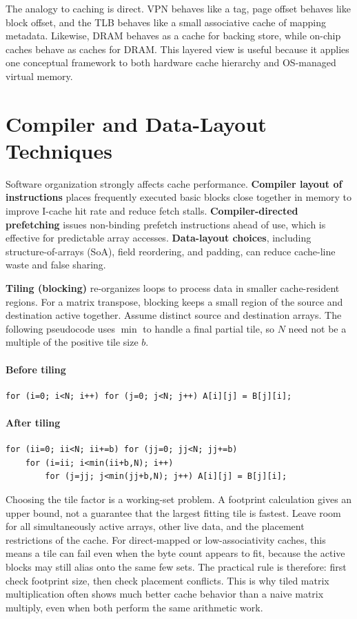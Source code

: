 The analogy to caching is direct.
VPN behaves like a tag, page offset behaves like block offset, and the TLB behaves like a small associative cache of mapping metadata.
Likewise, DRAM behaves as a cache for backing store, while on-chip caches behave as caches for DRAM\@.
This layered view is useful because it applies one conceptual framework to both hardware cache hierarchy and OS-managed virtual memory.


\section{Compiler and Data-Layout Techniques}\label{sec:auto-032}
Software organization strongly affects cache performance.
\textbf{Compiler layout of instructions} places frequently executed basic blocks close together in memory to improve I-cache hit rate and reduce fetch stalls.
\textbf{Compiler-directed prefetching} issues non-binding prefetch instructions ahead of use, which is effective for predictable array accesses.
\textbf{Data-layout choices}, including structure-of-arrays (SoA), field reordering, and padding, can reduce cache-line waste and false sharing.

\textbf{Tiling (blocking)} re-organizes loops to process data in smaller cache-resident regions.
For a matrix transpose, blocking keeps a small region of the source and destination active together.
Assume distinct source and destination arrays.
The following pseudocode uses $\min$ to handle a final partial tile, so $N$ need not be a multiple of the positive tile size $b$.
\paragraph{Before tiling}
\begin{verbatim}
for (i=0; i<N; i++) for (j=0; j<N; j++) A[i][j] = B[j][i];
\end{verbatim}
\paragraph{After tiling}
\begin{verbatim}
for (ii=0; ii<N; ii+=b) for (jj=0; jj<N; jj+=b)
    for (i=ii; i<min(ii+b,N); i++)
        for (j=jj; j<min(jj+b,N); j++) A[i][j] = B[j][i];
\end{verbatim}

Choosing the tile factor is a working-set problem.
A footprint calculation gives an upper bound, not a guarantee that the largest fitting tile is fastest.
Leave room for all simultaneously active arrays, other live data, and the placement restrictions of the cache.
For direct-mapped or low-associativity caches, this means a tile can fail even when the byte count appears to fit, because the active blocks may still alias onto the same few sets.
The practical rule is therefore: first check footprint size, then check placement conflicts.
This is why tiled matrix multiplication often shows much better cache behavior than a naive matrix multiply, even when both perform the same arithmetic work.


